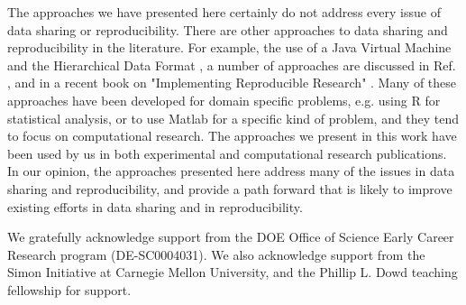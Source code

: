 \documentclass[journal=accacs,manuscript=article,email=true]{achemso}
\begin{document}
The approaches we have presented here certainly do not address every issue of data sharing or reproducibility.  There are other approaches to data sharing and reproducibility in the literature. For example, the use of a Java Virtual Machine and the Hierarchical Data Format  \cite{hinsen-2011}, a number of approaches are discussed in Ref. , and in a recent book on "Implementing Reproducible Research" \cite{stodden-2014-implem-reprod-resear}. Many of these approaches have been developed for domain specific problems, e.g. using R for statistical analysis, or to use Matlab for a specific kind of problem, and they tend to focus on computational research. The approaches we present in this work have been used by us in both experimental and computational research publications. In our opinion, the approaches presented here address many of the issues in data sharing and reproducibility, and provide a path forward that is likely to improve existing efforts in data sharing and in reproducibility.

\begin{acknowledgement}
We gratefully acknowledge support from the DOE Office of Science Early Career Research program (DE-SC0004031). We also acknowledge support from the Simon Initiative at Carnegie Mellon University, and the Phillip L. Dowd teaching fellowship for support.
\end{acknowledgement}
\end{document}

